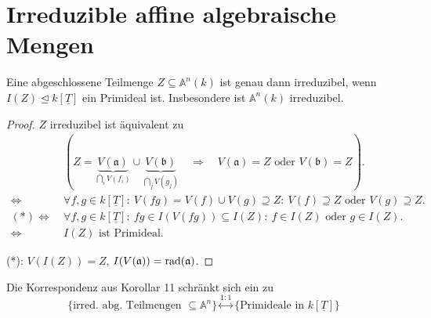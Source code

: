 
\section{Irreduzible affine algebraische Mengen}
\label{sec:irreduzibilitaet-alg}
\begin{lem}
  \label{lem:charakterisierung-irreduzibel-alg}
  Eine abgeschlossene Teilmenge $Z\subseteq\mathbb{A}^{n}(k)$ ist genau
  dann irreduzibel, wenn $I(Z) \unlhd k[\underline{T}]$ ein Primideal ist. Insbesondere ist
  $\mathbb{A}^{n}(k)$ irreduzibel.  
\end{lem}
\begin{proof}
  $Z$ irreduzibel ist äquivalent zu 
  \begin{align*}
    & (Z=\underbrace{V(\mathfrak{a})}_{\bigcap_{i} V(f_{i})}\cup\underbrace{V(\mathfrak{b})}_{\bigcap_{j} V(g_{j})}\quad\Rightarrow\quad V(\mathfrak{a})=Z\text{ oder }V(\mathfrak{b})=Z).\\
    \Leftrightarrow\  & \forall f,g\in k[\underline{T}]:\ V(fg)=V(f)\cup V(g)\supseteq Z:\ V(f)\supseteq Z\text{ oder }V(g)\supseteq Z.\\
    (*)\Leftrightarrow\  & \forall f,g\in k[\underline{T}]:\ fg\in I(V(fg))\subseteq I(Z):\ f\in I(Z)\text{ oder }g\in I(Z).\\
    \Leftrightarrow\  & I(Z)\text{ ist Primideal.}
  \end{align*}

  ({*}): $V(I(Z))=Z$, $I(V(\mathfrak{a}))=\operatorname{rad}(\mathfrak{a})$. 
\end{proof}
\begin{rem}
  \label{rem:korrespondenz-irreduzibel-prim}
  Die Korrespondenz aus Korollar 11 schränkt sich ein zu
  \[
    \{\text{irred. abg. Teilmengen }\subseteq\mathbb{A}^{n}\}\overset{1:1}{\leftrightarrow}\{\text{Primideale in }k[\underline{T}]\}
  \]
\end{rem}

